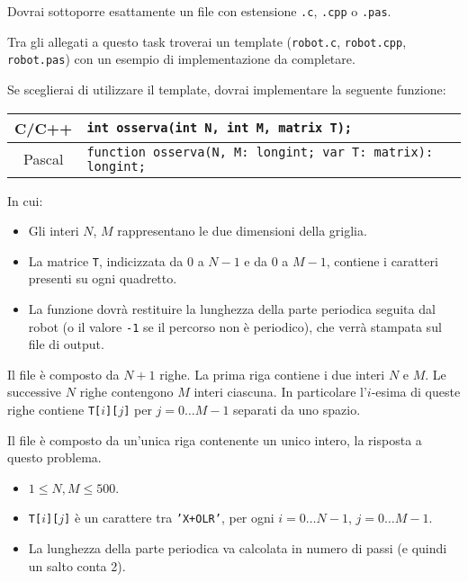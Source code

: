\Implementation
Dovrai sottoporre esattamente un file con estensione \texttt{.c}, \texttt{.cpp} o \texttt{.pas}.

\begin{warning}
Tra gli allegati a questo task troverai un template (\texttt{robot.c}, \texttt{robot.cpp}, \texttt{robot.pas}) con un esempio di implementazione da completare.
\end{warning}

Se sceglierai di utilizzare il template, dovrai implementare la seguente funzione:
\begin{center}\begin{tabularx}{\textwidth}{|c|X|}
\hline
C/C++  & \verb|int osserva(int N, int M, matrix T);|\\
\hline
Pascal & \verb|function osserva(N, M: longint; var T: matrix): longint;|\\
\hline
\end{tabularx}\end{center}
In cui:
\begin{itemize}[nolistsep]
  \item Gli interi $N$, $M$ rappresentano le due dimensioni della griglia.
  \item La matrice \texttt{T}, indicizzata da $0$ a $N-1$ e da $0$ a $M-1$, contiene i caratteri presenti su ogni quadretto.
  \item La funzione dovrà restituire la lunghezza della parte periodica seguita dal robot (o il valore \texttt{-1} se il percorso non è periodico), che verrà stampata sul file di output.
\end{itemize}

\InputFile
Il file  è composto da $N+1$ righe. La prima riga contiene i due interi $N$ e $M$. Le successive $N$ righe contengono $M$ interi ciascuna. In particolare l'$i$-esima di queste righe contiene \texttt{T[$i$][$j$]} per $j=0 \ldots M-1$ separati da uno spazio.

\OutputFile
Il file \outputfile{} è composto da un'unica riga contenente un unico intero, la risposta a questo problema.

\Constraints
\begin{itemize}[nolistsep, itemsep=2mm]
	\item $1 \le N, M \le 500$.
	\item \texttt{T[$i$][$j$]} è un carattere tra \texttt{'X+OLR'}, per ogni $i=0\ldots N-1$, $j=0\ldots M-1$.
	\item La lunghezza della parte periodica va calcolata in numero di passi (e quindi un salto conta 2).
\end{itemize}

